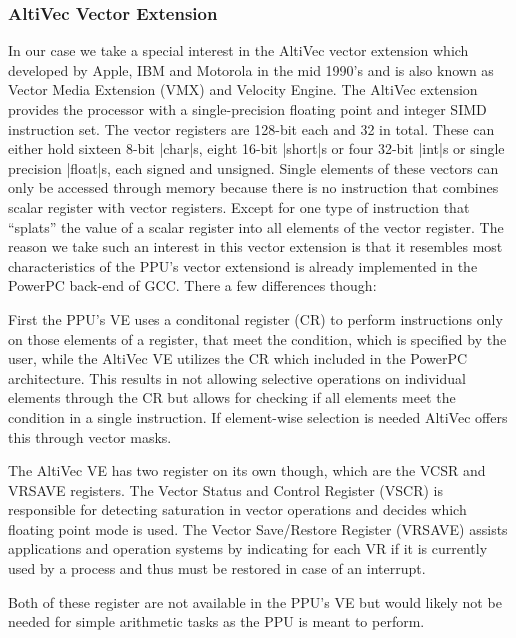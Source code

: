 \subsubsection{AltiVec Vector Extension}
In our case we take a special interest in the AltiVec vector extension which developed by Apple, IBM and Motorola in the mid 1990's and is also known as Vector Media Extension (VMX) and Velocity Engine. 
The AltiVec extension provides the processor with a single-precision floating point and integer SIMD instruction set.
The vector registers are 128-bit each and 32 in total. 
These can either hold sixteen 8-bit |char|s, eight 16-bit |short|s or four 32-bit |int|s or single precision |float|s, each signed and unsigned.
Single elements of these vectors can only be accessed through memory because there is no instruction that combines scalar register with vector registers.
Except for one type of instruction that ``splats'' the value of a scalar register into all elements of the vector register.
The reason we take such an interest in this vector extension is that it resembles most characteristics of the PPU's vector extensiond is already implemented in the PowerPC back-end of GCC.
There a few differences though:
\begin{addmargin}[2em]{0em}
    First the PPU's VE uses a conditonal register (CR) to perform instructions only on those elements of a register, that meet the condition, which is specified by the user, while the AltiVec VE utilizes the CR which included in the PowerPC architecture.
    This results in not allowing selective operations on individual elements through the CR but allows for checking if all elements meet the condition in a single instruction.
    If element-wise selection is needed AltiVec offers this through vector masks.
    
    The AltiVec VE has two register on its own though, which are the VCSR and VRSAVE registers.
            The Vector Status and Control Register (VSCR) is responsible for detecting saturation in vector operations and decides which floating point mode is used.
            The Vector Save/Restore Register (VRSAVE) assists applications and operation systems by indicating for each VR if it is currently used by a process and thus must be restored in case of an interrupt.
    
    Both of these register are not available in the PPU's VE but would likely not be needed for simple arithmetic tasks as the PPU is meant to perform.
\end{addmargin}
    
